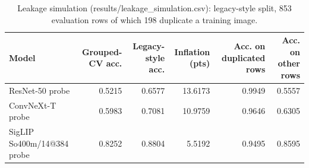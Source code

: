 \begin{table}[t]
\centering\small
\caption{Leakage simulation (results/leakage\_simulation.csv): legacy-style split, 853 evaluation rows of which 198 duplicate a training image.}
\label{tab:leakage_simulation}
\begin{tabular}{lrrrrr}
\toprule
Model & Grouped-CV acc. & Legacy-style acc. & Inflation (pts) & Acc. on duplicated rows & Acc. on other rows \\
\midrule
ResNet-50 probe & 0.5215 & 0.6577 & 13.6173 & 0.9949 & 0.5557 \\
ConvNeXt-T probe & 0.5983 & 0.7081 & 10.9759 & 0.9646 & 0.6305 \\
SigLIP So400m/14@384 probe & 0.8252 & 0.8804 & 5.5192 & 0.9495 & 0.8595 \\
\bottomrule
\end{tabular}
\end{table}
